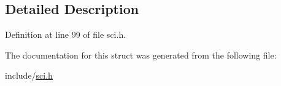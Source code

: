 \subsection{Detailed Description}


Definition at line 99 of file sci.\+h.



The documentation for this struct was generated from the following file\+:\begin{DoxyCompactItemize}
\item 
include/\mbox{\hyperlink{sci_8h}{sci.\+h}}\end{DoxyCompactItemize}
